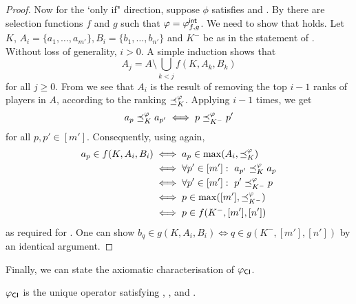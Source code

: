 \begin{proof}
    Now for the `only if" direction, suppose $\phi$ satisfies
    \chaindef{} and \rankremoval{}. By
     there are selection functions
    $f$ and $g$ such that $\varphi = {\varphi_{f, g}^\mathsf{int}}$. We need to show that
    \smi{} holds. Let $K$, $A_i = \{a_1, \ldots, a_{m'}\}, B_i = \{b_1,
    \ldots, b_{n'}\}$ and $K^-$ be as in the statement of \smi{}.
    Without loss of generality, $i > 0 $. A simple induction shows that
    \[
        A_j = A \setminus \bigcup_{k < j}{f(K, A_k, B_k)}
    \]
    for all $j \ge 0$. From  we see
    that $A_i$ is the result of removing the top $i - 1$ ranks of players in
    $A$, according to the ranking $\preceq_K^\varphi$. Applying
    \rankremoval{} $i - 1$ times, we get
    \[
        a_p \preceq_K^\varphi a_{p'}
        \iff p \preceq_{K^-}^\varphi p'
    \]
    for all $p, p' \in [m']$. Consequently, using
     again,
    \begin{align*}
        a_p \in f(K, A_i, B_i)
        &\iff a_p \in \max(A_i, {\preceq_K^\varphi}) \\
        &\iff \forall p' \in [m']:\ a_{p'} \preceq_K^\varphi a_p \\
        &\iff \forall p' \in [m']:\ p' \preceq_{K^-}^\varphi p \\
        &\iff p \in \max([m'], {\preceq_{K^-}^\varphi}) \\
        &\iff p \in f(K^-, [m'], [n'])
    \end{align*}
    as required for \smi{}. One can show $b_q \in g(K, A_i, B_i) \iff q
    \in g(K^-, [m'], [n'])$ by an identical argument.
\end{proof}

Finally, we can state the axiomatic characterisation of ${\varphi_{\mathsf{CI}}}$.

\begin{theorem}
    ${\varphi_{\mathsf{CI}}}$ is the unique operator satisfying \dualaxiom{},
    \chaindef{}, \rankremoval{} and \argmaxaxiom{}.
\end{theorem}

